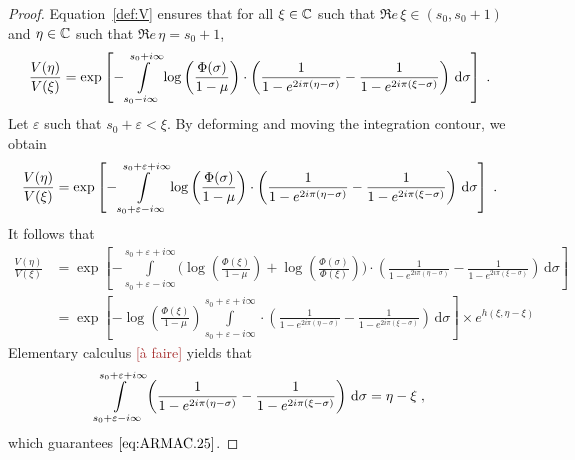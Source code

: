 \documentclass[11pt]{amsart}
\renewcommand{\Re}{\mathfrak{R}e}
\newcommand{\diff}{\,\mathrm{d}}
\newcommand{\ndr}[1]{\textcolor{brown}{[#1]}}
\begin{document}
\begin{proof}
    Equation~\eqref{def:V} ensures that for all $\xi \in \mathbb{C}$ such that $\Re \,\xi\in (s_0, s_0+1)$ and $\eta \in \mathbb{C}$ such that $\Re \, \eta = s_0+1$,
    \begin{align*}
        \frac{V(\eta)}{V(\xi)}
        = 
        \exp \left[
        - \int\limits_{s_0-i\infty}^{s_0+i\infty}\log \left( \frac{\Phi(\sigma)}{1-\mu}\right)
        \cdot \left(
            \frac{1}{1-e^{2i\pi(\eta-\sigma)}} - \frac{1}{1-e^{2i\pi(\xi-\sigma)}}
         \right) \diff \sigma 
        \right]
        \eqfinp
    \end{align*}
    Let $\varepsilon$ such that $s_0 + \varepsilon < \xi$. By deforming and moving the integration contour, we obtain 
    \begin{align*}
        \frac{V(\eta)}{V(\xi)}
        = 
        \exp \left[
        - \int\limits_{s_0+\varepsilon-i\infty}^{s_0+\varepsilon+i\infty}\log \left( \frac{\Phi(\sigma)}{1-\mu}\right)
        \cdot \left(
            \frac{1}{1-e^{2i\pi(\eta-\sigma)}} - \frac{1}{1-e^{2i\pi(\xi-\sigma)}}
         \right) \diff \sigma 
        \right]
        \eqfinp
    \end{align*}
    It follows that 
    \begin{align*}
        \frac{V(\eta)}{V(\xi)}
        &= 
        \exp \left[
        - \int\limits_{s_0+\varepsilon-i\infty}^{s_0+\varepsilon+i\infty}
        \big(\log \left( \frac{\Phi(\xi)}{1-\mu}\right) + 
        \log \left( \frac{\Phi(\sigma)}{\Phi(\xi)}\right)
        \big)
        \cdot 
        \left(
            \frac{1}{1-e^{2i\pi(\eta-\sigma)}} - \frac{1}{1-e^{2i\pi(\xi-\sigma)}}
         \right) \diff \sigma 
        \right] \\
        &=  \exp \left[
            - \log \left( \frac{\Phi(\xi)}{1-\mu}\right)\int\limits_{s_0+\varepsilon-i\infty}^{s_0+\varepsilon+i\infty}
            \cdot 
            \left(
                \frac{1}{1-e^{2i\pi(\eta-\sigma)}} - \frac{1}{1-e^{2i\pi(\xi-\sigma)}}
             \right) \diff \sigma 
            \right]
            \times
            e^{h(\xi, \eta-\xi)}
    \end{align*}
Elementary calculus \ndr{à faire} yields that 
\begin{align*}
    \int\limits_{s_0+\varepsilon-i\infty}^{s_0+\varepsilon+i\infty}
            \left(
                \frac{1}{1-e^{2i\pi(\eta-\sigma)}} - \frac{1}{1-e^{2i\pi(\xi-\sigma)}}
             \right) \diff \sigma 
    = 
    \eta - \xi
    \eqfinv
\end{align*}
which guarantees $\eqref{eq:ARMAC.25}$. 
\end{proof}
\end{document}
